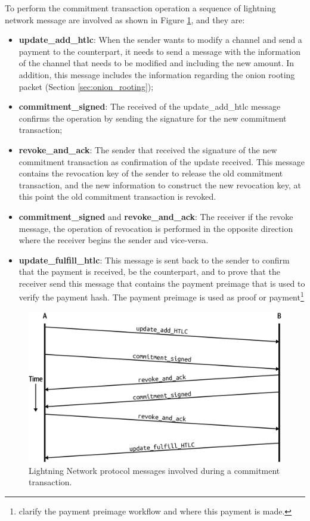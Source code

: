 To perform the commitment transaction operation a sequence of lightning network message are involved as shown in Figure \ref{fig:commitment_transaction_ln_messages}, and they are:

\begin{itemize}
  \item {\bf update\_add\_htlc}: When the sender wants to modify a channel and send a payment to the counterpart, it needs to send a message with the information of the channel that needs to be modified and including the new amount. In addition, this message includes
  the information regarding the onion rooting packet (Section \ref{sec:onion_rooting});
  \item {\bf commitment\_signed}: The received of the update\_add\_htlc message confirms the operation by sending the signature for the new commitment transaction;
  \item {\bf revoke\_and\_ack}: The sender that received the signature of the new commitment transaction as confirmation of the update received. This message contains the revocation key of the sender to release the old commitment transaction, and the new information to construct the new revocation key, at this point the old commitment transaction is revoked.
  \item {\bf commitment\_signed} and {\bf revoke\_and\_ack}: The receiver if the revoke message, the operation of revocation is performed in the opposite direction where the receiver begins the sender and vice-versa.
  \item {\bf update\_fulfill\_htlc}: This message is sent back to the sender to confirm that the payment is received, be the counterpart, and to prove that the receiver send this message that contains the payment preimage that is used to verify the payment hash. The payment preimage is used as proof or payment\footnote{clarify the payment preimage workflow and where this payment is made.}
\end{itemize}


\begin{figure}[h]
  \begin{center}
  \includegraphics[width=0.6\columnwidth]{imgs/mtln_0903.png}
  \end{center}
  \caption{Lightning Network protocol messages involved during a commitment transaction.}
  \label{fig:commitment_transaction_ln_messages}
\end{figure}


